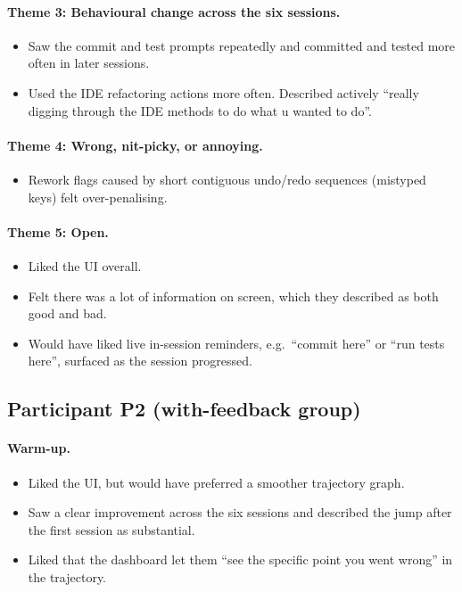 \paragraph{Theme 3: Behavioural change across the six sessions.}
\begin{itemize}
  \item Saw the commit and test prompts repeatedly and committed and tested more often in later sessions.
  \item Used the IDE refactoring actions more often. Described actively ``really digging through the IDE methods to do what u wanted to do''.
\end{itemize}

\paragraph{Theme 4: Wrong, nit-picky, or annoying.}
\begin{itemize}
  \item Rework flags caused by short contiguous undo/redo sequences (mistyped keys) felt over-penalising.
\end{itemize}

\paragraph{Theme 5: Open.}
\begin{itemize}
  \item Liked the UI overall.
  \item Felt there was a lot of information on screen, which they described as both good and bad.
  \item Would have liked live in-session reminders, e.g.\ ``commit here'' or ``run tests here'', surfaced as the session progressed.
\end{itemize}

\subsection{Participant P2 (with-feedback group)}

\paragraph{Warm-up.}
\begin{itemize}
  \item Liked the UI, but would have preferred a smoother trajectory graph.
  \item Saw a clear improvement across the six sessions and described the jump after the first session as substantial.
  \item Liked that the dashboard let them ``see the specific point you went wrong'' in the trajectory.
\end{itemize}


